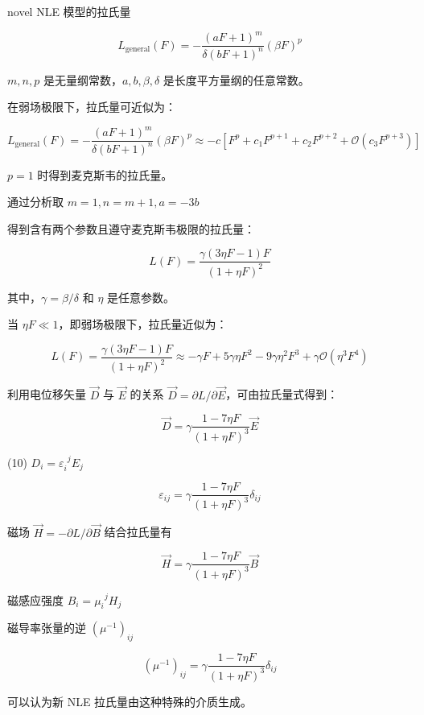 \documentclass[9pt, dvipsnames]{beamer} %
\begin{document}
\begin{frame}
novel NLE 模型的拉氏量

$$
L_{\mathrm{general}}(F)
=-\frac{\left(aF+1 \right)^m }{\delta(bF+1)^n } \left(\beta F \right)^p
$$

$m,n,p $ 是无量纲常数，$a,b,\beta,\delta $ 是长度平方量纲的任意常数。

在弱场极限下，拉氏量可近似为：

$$
L_{\mathrm{general}}(F)
=-\frac{\left(aF+1 \right)^m }{\delta(bF+1)^n } \left(\beta F \right)^p
\approx -c\left[F^p + c_1 F^{p+1} +c_2 F^{p+2}  + \mathcal{O}\left(c_3 F^{p+3} \right) \right]
$$

$p=1 $ 时得到麦克斯韦的拉氏量。

通过分析取 $m=1,n=m+1,a=-3b $

得到含有两个参数且遵守麦克斯韦极限的拉氏量：

$$
L(F)
=\frac{\gamma(3\eta F - 1 )F }{(1+\eta F)^2 }
$$

其中，$\gamma=\beta/\delta $ 和 $\eta $ 是任意参数。

当 $\eta F\ll 1 $，即弱场极限下，拉氏量近似为：

$$
L(F)
=\frac{\gamma(3\eta F - 1 )F }{(1+\eta F)^2 } 
\approx -\gamma F + 5\gamma \eta F^2 -9\gamma \eta^2 F^3 + \gamma\mathcal{O}\left(\eta^3F^4 \right) 
$$
\end{frame}

\begin{frame}
利用电位移矢量 $\vec{D} $ 与 $\vec{E} $ 的关系 $\vec{D}=\partial L/\partial \vec{E} $，可由拉氏量式得到：

$$
\vec{D}
=\gamma\frac{1-7\eta F }{(1+\eta F)^3 } \vec{E}
$$

(10) $D_i = \varepsilon_i^{~~ j } E_j $

$$
\varepsilon_{ij} = \gamma \frac{1-7\eta F }{(1+\eta F)^3 }\delta_{ij} 
$$

磁场 $\vec{H}=-\partial L/\partial \vec{B} $ 结合拉氏量有

$$
\vec{H}
=\gamma \frac{1-7\eta F }{(1+\eta F)^3 } \vec{B}
$$

磁感应强度 $B_i=\mu_i^{~~j}H_j $

磁导率张量的逆 $\left(\mu^{-1} \right)_{ij} $

$$
\left(\mu^{-1} \right)_{ij}
=\gamma \frac{1-7\eta F }{(1+\eta F)^3 } \delta_{ij}
$$

可以认为新 NLE 拉氏量由这种特殊的介质生成。
\end{frame}
\end{document}
